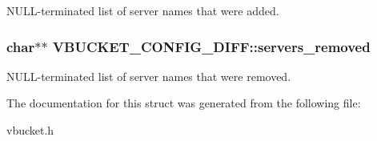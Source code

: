 NULL-\/terminated list of server names that were added. 

\hypertarget{struct_v_b_u_c_k_e_t___c_o_n_f_i_g___d_i_f_f_a9a94896717369cad33a7d38b38652526}{
\subsubsection[{servers\_\-removed}]{\setlength{\rightskip}{0pt plus 5cm}char$\ast$$\ast$ {\bf VBUCKET\_\-CONFIG\_\-DIFF::servers\_\-removed}}}
\label{struct_v_b_u_c_k_e_t___c_o_n_f_i_g___d_i_f_f_a9a94896717369cad33a7d38b38652526}


NULL-\/terminated list of server names that were removed. 



The documentation for this struct was generated from the following file:\begin{DoxyCompactItemize}
\item 
vbucket.h\end{DoxyCompactItemize}

